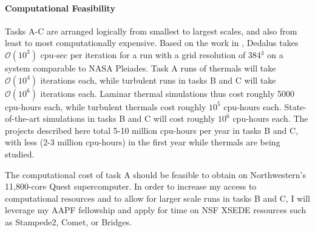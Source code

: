\documentclass[11pt, preprint]{aastex}
\begin{document}
\vspace{-0.5cm}
\paragraph{Computational Feasibility}
\label{sct:feasibility}
Tasks A-C are arranged logically from smallest to largest scales, and also from least to most computationally expensive.
Based on the work in \citet{anders&brown2017, anders&all2018, anders&all2019, andersLB2019}, Dedalus takes $\mathcal{O}(10^3)$ cpu-sec per iteration for a run with a grid resolution of 384$^3$ on a system comparable to NASA Pleiades.
Task A runs of thermals will take $\mathcal{O}(10^4)$ iterations each, while turbulent runs in tasks B and C will take $\mathcal{O}(10^6)$ iterations each.
Laminar thermal simulations thus cost roughly 5000 cpu-hours each, while turbulent thermals cost roughly $10^5$ cpu-hours each.
State-of-the-art simulations in tasks B and C will cost roughly $10^6$ cpu-hours each.
The projects described here total 5-10 million cpu-hours per year in tasks B and C, with less (2-3 million cpu-hours) in the first year while thermals are being studied.

The computational cost of task A should be feasible to obtain on Northwestern's 11,800-core Quest supercomputer.
In order to increase my access to computational resources and to allow for larger scale runs in tasks B and C, I will leverage my AAPF fellowship and apply for time on NSF XSEDE resources such as Stampede2, Comet, or Bridges.


\vspace{-0.5cm}
\end{document}
